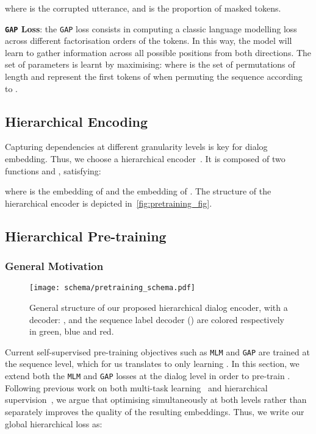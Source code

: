 \documentclass[11pt,a4paper]{article}
\begin{document}
where  is the corrupted utterance,    and  is the proportion of masked tokens.

\noindent\textbf{\texttt{GAP} Loss}: the \texttt{GAP} loss consists in computing a classic language modelling loss across different factorisation orders of the tokens. In this way, the model will learn to gather information across all possible positions from both directions. The set of parameters  is learnt by maximising:
 where  is the set of permutations of length  and  represent the first  tokens of  when permuting the sequence according to . 

\subsection{Hierarchical Encoding}
Capturing dependencies at different granularity levels is key for dialog embedding.
Thus, we choose a hierarchical encoder~\cite{crf_chen, sota_swda_1}. It is composed of two functions  and , satisfying:

where  is the embedding of  and  the embedding of . The structure of the hierarchical encoder is depicted in~\autoref{fig:pretraining_fig}.

\subsection{Hierarchical Pre-training}
\subsubsection{General Motivation}
\begin{figure}[ht]
    \centering
    \texttt{[image: schema/pretraining\_schema.pdf]}
    \caption{General structure of our proposed hierarchical dialog encoder, with a decoder: ,  and the sequence label decoder () are colored respectively in green, blue and red.}
    \label{fig:pretraining_fig}\vspace{-.3cm}
\end{figure}
Current self-supervised pre-training objectives such as \texttt{MLM} and \texttt{GAP} are trained at the sequence level, which for us translates to only learning .
In this section, we extend both the \texttt{MLM} and \texttt{GAP} losses at the dialog level in order to pre-train .
Following previous work on both multi-task learning~\cite{multi_task_1,multi_task_2} and hierarchical supervision~\cite{garcia2019token,hierarchy_loss}, we argue that optimising simultaneously at both levels rather than separately improves the quality of the resulting embeddings.
Thus, we write our global hierarchical loss as:
\end{document}
